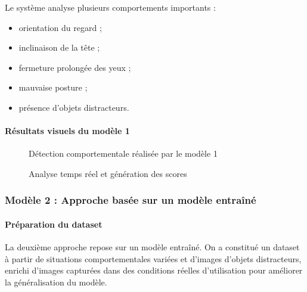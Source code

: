 Le système analyse plusieurs comportements importants :

\begin{itemize}
    \item orientation du regard ;
    
    \item inclinaison de la tête ;
    
    \item fermeture prolongée des yeux ;
    
    \item mauvaise posture ;
    
    \item présence d’objets distracteurs.
\end{itemize}


\paragraph{Résultats visuels du modèle 1}

\begin{figure}[H]
    \centering
    \caption{Détection comportementale réalisée par le modèle 1}
    \label{fig:model1_detection1}
\end{figure}

\begin{figure}[H]
    \centering
    \caption{Analyse temps réel et génération des scores}
    \label{fig:model1_detection2}
\end{figure}

\subsubsection{Modèle 2 : Approche basée sur un modèle entraîné}

\paragraph{Préparation du dataset}

La deuxième approche repose sur un modèle entraîné. On a constitué un dataset à partir de situations comportementales variées et d’images d’objets distracteurs, enrichi d’images capturées dans des conditions réelles d’utilisation pour améliorer la généralisation du modèle.

